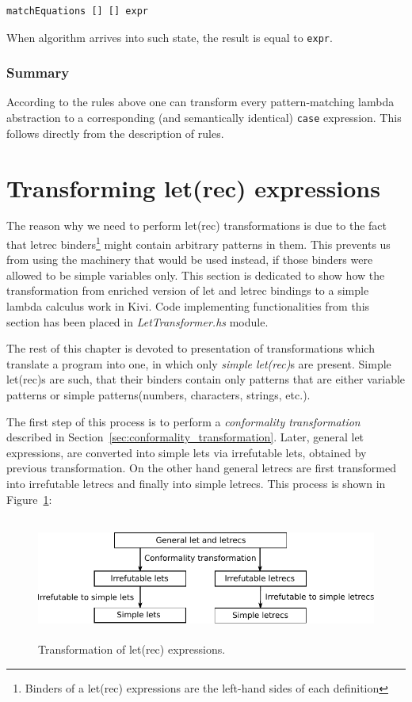 \documentclass[12pt,a4paper]{report}
\begin{document}
\vspace*{0.2in}
\begin{lstlisting}[style=haskell]
matchEquations [] [] expr
\end{lstlisting}
When algorithm arrives into such state, the result is equal to \texttt{expr}.

\subsubsection{Summary}
According to the rules above one can transform every pattern-matching lambda
abstraction to a corresponding (and semantically identical) \texttt{case}
expression. This follows directly from the description of rules.

\section{Transforming let(rec) expressions}
\label{sec:letrec_transform}
The reason why we need to perform let(rec) transformations is due to the fact
that letrec binders\footnote{Binders of a let(rec) expressions are the
left-hand sides of each definition} might contain arbitrary patterns in them.
This prevents us from using the machinery that would be used instead, if those
binders were allowed to be simple variables only. This section is dedicated to
show how the transformation from enriched version of let and letrec bindings to
a simple lambda calculus work in Kivi. Code implementing functionalities from
this section has been placed in \textit{LetTransformer.hs} module.

The rest of this chapter is devoted to presentation of transformations which
translate a program into one, in which only \textit{simple let(rec)}s are
present. Simple let(rec)s are such, that their binders contain only patterns
that are either variable patterns or simple patterns(numbers, characters,
strings, etc.).

The first step of this process is to perform a \textit{conformality
transformation} described in Section~\ref{sec:conformality_transformation}.
Later, general let expressions, are converted into simple lets via irrefutable
lets, obtained by previous transformation. On the other hand general letrecs
are first transformed into irrefutable letrecs and finally into simple letrecs.
This process is shown in Figure~\ref{fig:letrec_transform}:

\begin{figure}[h!]
  \centering
  \includegraphics[height=4cm]{let_transform}
  \caption{Transformation of let(rec) expressions.}
  \label{fig:letrec_transform}
\end{figure}
\end{document}
